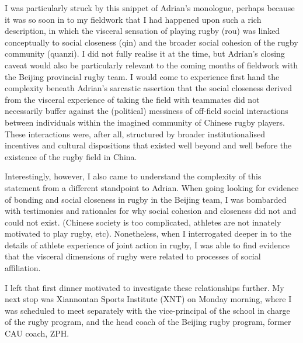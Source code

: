 I was particularly struck by this snippet of Adrian's monologue, perhaps because it was so soon in to my fieldwork that I had happened upon such a rich description, in which the visceral sensation of playing rugby (rou) was linked conceptually to social closeness (qin) and the broader social cohesion of the rugby community (quanzi).  I did not fully realise it at the time, but Adrian's closing caveat would also be particularly relevant to the coming months of fieldwork with the Beijing provincial rugby team. I would come to experience first hand the complexity beneath Adrian's sarcastic assertion that the social closeness derived from the visceral experience of taking the field with teammates did not necessarily buffer against the (political) messiness of off-field social interactions between individuals within the imagined community of Chinese rugby players.  These interactions were, after all, structured by broader institutionalised incentives and cultural dispositions that existed well beyond and well before the existence of the rugby field in China.

Interestingly, however, I also came to understand the complexity of this statement from a different standpoint to Adrian.  When going looking for evidence of bonding and social closeness in rugby in the Beijing team, I was bombarded with testimonies and rationales for why social cohesion and closeness did not and could not exist.  (Chinese society is too complicated, athletes are not innately motivated to play rugby, etc).  Nonetheless, when I interrogated deeper in to the details of athlete experience of joint action in rugby, I was able to find evidence that the visceral dimensions of rugby were related to processes of social affiliation.

I left that first dinner motivated to investigate these relationships further.  My next stop was Xiannontan Sports Institute (XNT) on Monday morning, where I was scheduled to meet separately with the vice-principal of the school in charge of the rugby program, and the head coach of the Beijing rugby program, former CAU coach, ZPH.



